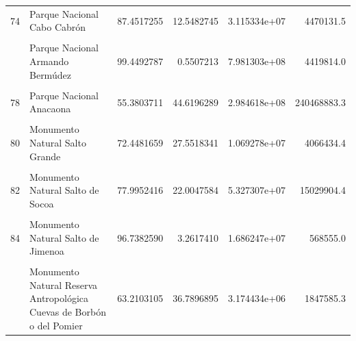 \documentclass[10pt,landscape,a3paper]{article}
\begin{document}
\begin{longtable}[t]{llrrrr}
74 & Parque Nacional Cabo Cabrón & 87.4517255 & 12.5482745 & 3.115334e+07 & 4470131.5\\
\cellcolor{lightgray}{75} & \cellcolor{lightgray}{Parque Nacional Baiguate} & \cellcolor{lightgray}{86.6759322} & \cellcolor{lightgray}{13.3240678} & \cellcolor{lightgray}{4.544164e+07} & \cellcolor{lightgray}{6985416.1}\\
\addlinespace
76 & Parque Nacional Armando Bermúdez & 99.4492787 & 0.5507213 & 7.981303e+08 & 4419814.0\\
\cellcolor{lightgray}{77} & \cellcolor{lightgray}{Parque Nacional Aniana Vargas} & \cellcolor{lightgray}{66.2654500} & \cellcolor{lightgray}{33.7345500} & \cellcolor{lightgray}{8.589790e+07} & \cellcolor{lightgray}{43729077.2}\\
78 & Parque Nacional Anacaona & 55.3803711 & 44.6196289 & 2.984618e+08 & 240468883.3\\
\cellcolor{lightgray}{79} & \cellcolor{lightgray}{Monumento Natural Saltos de Jima} & \cellcolor{lightgray}{64.1597654} & \cellcolor{lightgray}{35.8402346} & \cellcolor{lightgray}{1.191080e+07} & \cellcolor{lightgray}{6653483.8}\\
80 & Monumento Natural Salto Grande & 72.4481659 & 27.5518341 & 1.069278e+07 & 4066434.4\\
\addlinespace
\cellcolor{lightgray}{81} & \cellcolor{lightgray}{Monumento Natural Salto El Limón} & \cellcolor{lightgray}{88.1772739} & \cellcolor{lightgray}{11.8227261} & \cellcolor{lightgray}{1.452719e+07} & \cellcolor{lightgray}{1947792.3}\\
82 & Monumento Natural Salto de Socoa & 77.9952416 & 22.0047584 & 5.327307e+07 & 15029904.4\\
\cellcolor{lightgray}{83} & \cellcolor{lightgray}{Monumento Natural Salto de La Damajagua} & \cellcolor{lightgray}{96.2903869} & \cellcolor{lightgray}{3.7096131} & \cellcolor{lightgray}{5.320742e+06} & \cellcolor{lightgray}{204983.0}\\
84 & Monumento Natural Salto de Jimenoa & 96.7382590 & 3.2617410 & 1.686247e+07 & 568555.0\\
\cellcolor{lightgray}{85} & \cellcolor{lightgray}{Monumento Natural Río Cumayasa y Cueva de las Maravillas} & \cellcolor{lightgray}{36.6842668} & \cellcolor{lightgray}{63.3157332} & \cellcolor{lightgray}{3.256086e+07} & \cellcolor{lightgray}{56198878.1}\\
\addlinespace
86 & Monumento Natural Reserva Antropológica Cuevas de Borbón o del Pomier & 63.2103105 & 36.7896895 & 3.174434e+06 & 1847585.3\\

\end{longtable}
\end{document}
